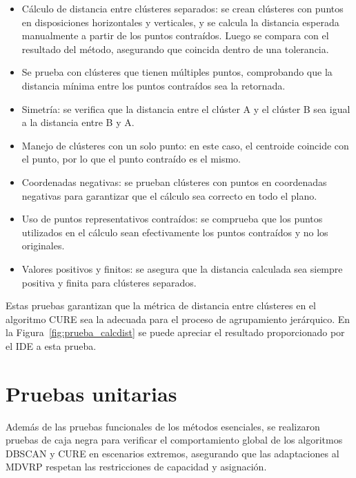 \begin{itemize}
  \item C\'alculo de distancia entre cl\'usteres separados: se crean cl\'usteres con puntos en disposiciones horizontales y verticales, y se calcula la distancia esperada manualmente a partir de los puntos contra\'idos. Luego se compara con el resultado del m\'etodo, asegurando que coincida dentro de una tolerancia.
  \item Se prueba con cl\'usteres que tienen m\'ultiples puntos, comprobando que la distancia m\'inima entre los puntos contra\'idos sea la retornada.
  \item Simetr\'ia: se verifica que la distancia entre el cl\'uster A y el cl\'uster B sea igual a la distancia entre B y A.
  \item Manejo de cl\'usteres con un solo punto: en este caso, el centroide coincide con el punto, por lo que el punto contra\'ido es el mismo.
  \item Coordenadas negativas: se prueban cl\'usteres con puntos en coordenadas negativas para garantizar que el c\'alculo sea correcto en todo el plano.
  \item Uso de puntos representativos contra\'idos: se comprueba que los puntos utilizados en el c\'alculo sean efectivamente los puntos contra\'idos y no los originales.
  \item Valores positivos y finitos: se asegura que la distancia calculada sea siempre positiva y finita para cl\'usteres separados.
\end{itemize}

Estas pruebas garantizan que la m\'etrica de distancia entre cl\'usteres en el algoritmo CURE sea la adecuada para el proceso de agrupamiento jer\'arquico. En la Figura~\ref{fig:prueba_calcdist} se puede apreciar el resultado proporcionado por el IDE a esta prueba.


\section{Pruebas unitarias}

Adem\'as de las pruebas funcionales de los m\'etodos esenciales, se realizaron pruebas de caja negra para verificar el comportamiento global de los algoritmos DBSCAN y CURE en escenarios extremos, asegurando que las adaptaciones al MDVRP respetan las restricciones de capacidad y asignaci\'on.

